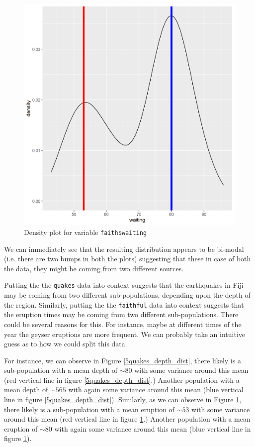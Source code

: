 \begin{figure}[h]
\centering
\includegraphics[scale=0.75, keepaspectratio]{ex5/5faith_wait_dist.png}
\caption{Density plot for  variable \texttt{faith\$waiting}}
\label{5faith_wait_dist}
\end{figure}

We can immediately see that the resulting distribution appears to be bi-modal (i.e. there are two bumps in both the plots) suggesting that these in case of both the data, they might be coming from two different sources.


Putting the the \texttt{quakes} data into context suggests that the earthquakes in Fiji may be coming from two different sub-populations, depending upon the depth of the region. Similarly, putting the the \texttt{faithful} data into context suggests that the eruption times may be coming from two different sub-populations. There could be several reasons for this. For instance, maybe at different times of the year the geyser eruptions are more frequent. We can probably take an intuitive guess as to how we could split this data.

For instance, we can observe in Figure \ref{5quakes_depth_dist}, there likely is a sub-population with a mean depth of $\sim 80$ with some variance around this mean (red vertical line in figure \ref{5quakes_depth_dist}.) Another population with a mean depth of $\sim 565$ with again some variance around this mean (blue vertical line in figure \ref{5quakes_depth_dist}). Similarly, as we can observe in Figure \ref{5faith_wait_dist}, there likely is a sub-population with a mean eruption of $\sim 53$ with some variance around this mean (red vertical line in figure \ref{5faith_wait_dist}.) Another population with a mean eruption of $\sim 80$ with again some variance around this mean (blue vertical line in figure \ref{5faith_wait_dist}).

